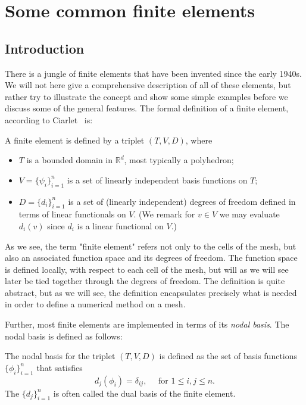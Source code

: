 \chapter{Some common finite elements}
\label{element}

\section{Introduction}

There is a jungle of finite elements that have been invented since the early 1940s. We
will not here give a comprehensive description of all of these elements, but 
rather try to illustrate the concept and show some simple examples before we discuss some of the general features. 
The formal definition of a finite element, according to Ciarlet~\cite{ciarlet2002finite} is: 

\begin{defin}
A finite element is defined by a triplet $(T, V, D)$, where 
\begin{itemize}
\item $T$ is a bounded domain in $\mathbb{R}^d$, most typically a polyhedron; 
\item $V = \{\psi_i\}_{i=1}^n$ is a set of linearly independent basis functions on $T$; 
\item $D = \{d_i\}^n_{i=1}$ is a set of (linearly independent) 
	degrees of freedom defined in terms of linear functionals on $V$. (We remark for $v\in V$ we may evaluate $d_i(v)$ 
		since $d_i$ is a linear functional on $V$.) 
\end{itemize}
\end{defin}
As we see, the term "finite element" refers not only to the cells of the mesh, but also an associated function space and its degrees of freedom. 
The function space is defined locally, with respect to each cell of the mesh, but will as we will see later be tied together through 
the degrees of freedom. 
The definition is quite abstract, but as we will see, the definition encapsulates precisely what is needed in order to define a numerical method on a mesh. 

Further, most finite elements are implemented in terms of its \emph{nodal basis}. The nodal basis is defined as follows: 
\begin{defin}
\label{nodal:basis}
The nodal basis for the triplet  $(T, V, D)$ is defined as the set of basis functions
$\{\phi_i\}^n_{i=1}$ that satisfies  
\[
	d_j(\phi_i) = \delta_{ij}, \quad \mbox{ for } 1 \le i,j \le n. 
\]
The $\{d_j\}^n_{i=1}$ is often called the dual basis of the finite element.  
\end{defin}

